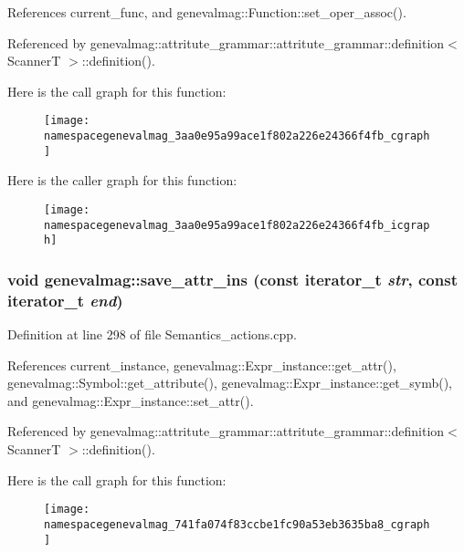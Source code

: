 References current\_\-func, and genevalmag::Function::set\_\-oper\_\-assoc().

Referenced by genevalmag::attritute\_\-grammar::attritute\_\-grammar::definition$<$ ScannerT $>$::definition().

Here is the call graph for this function:\nopagebreak
\begin{figure}[H]
\begin{center}
\leavevmode
\texttt{[image: namespacegenevalmag\_3aa0e95a99ace1f802a226e24366f4fb\_cgraph]}
\end{center}
\end{figure}


Here is the caller graph for this function:\nopagebreak
\begin{figure}[H]
\begin{center}
\leavevmode
\texttt{[image: namespacegenevalmag\_3aa0e95a99ace1f802a226e24366f4fb\_icgraph]}
\end{center}
\end{figure}
\hypertarget{namespacegenevalmag_741fa074f83ccbe1fc90a53eb3635ba8}{
\subsubsection[{save\_\-attr\_\-ins}]{\setlength{\rightskip}{0pt plus 5cm}void genevalmag::save\_\-attr\_\-ins (const iterator\_\-t {\em str}, \/  const iterator\_\-t {\em end})}}
\label{namespacegenevalmag_741fa074f83ccbe1fc90a53eb3635ba8}




Definition at line 298 of file Semantics\_\-actions.cpp.

References current\_\-instance, genevalmag::Expr\_\-instance::get\_\-attr(), genevalmag::Symbol::get\_\-attribute(), genevalmag::Expr\_\-instance::get\_\-symb(), and genevalmag::Expr\_\-instance::set\_\-attr().

Referenced by genevalmag::attritute\_\-grammar::attritute\_\-grammar::definition$<$ ScannerT $>$::definition().

Here is the call graph for this function:\nopagebreak
\begin{figure}[H]
\begin{center}
\leavevmode
\texttt{[image: namespacegenevalmag\_741fa074f83ccbe1fc90a53eb3635ba8\_cgraph]}
\end{center}
\end{figure}



